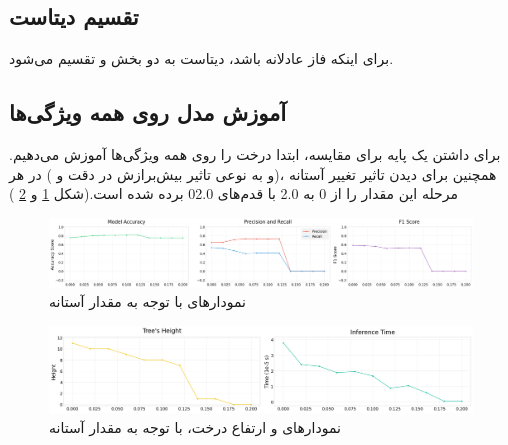 \documentclass{article}
\begin{document}
	\subsection{تقسیم دیتاست}
	برای اینکه فاز 
	عادلانه باشد، دیتاست به دو بخش 
	و
	تقسیم می‌شود.\\
	\subsection{آموزش مدل روی همه ویژگی‌ها}
	برای داشتن یک پایه برای مقایسه، ابتدا درخت را روی همه ویژگی‌ها آموزش می‌دهیم. همچنین برای دیدن تاثیر تغییر آستانه
	،(و به نوعی تاثیر بیش‌برازش در دقت و 
	) در هر مرحله این مقدار را از 0 به 2.0 با قدم‌های 02.0 برده شده است.(شکل 
	\ref{fig: ig all train}
	و
	\ref{fig: ig all train2}
	)
	\begin{figure}[H]
		\centering
		\includegraphics[scale=0.3]{figs/all_feature_train1}
		\caption{
			نمودار‌های 
			با توجه به مقدار آستانه
		}
		\label{fig: ig all train}
	\end{figure}
	\begin{figure}[H]
		\centering
		\includegraphics[scale=0.3]{figs/all_feature_train2}
		\caption{
			نمودار‌های 
			و ارتفاع درخت،
			با توجه به مقدار آستانه
		}
		\label{fig: ig all train2}
	\end{figure}
\end{document}
